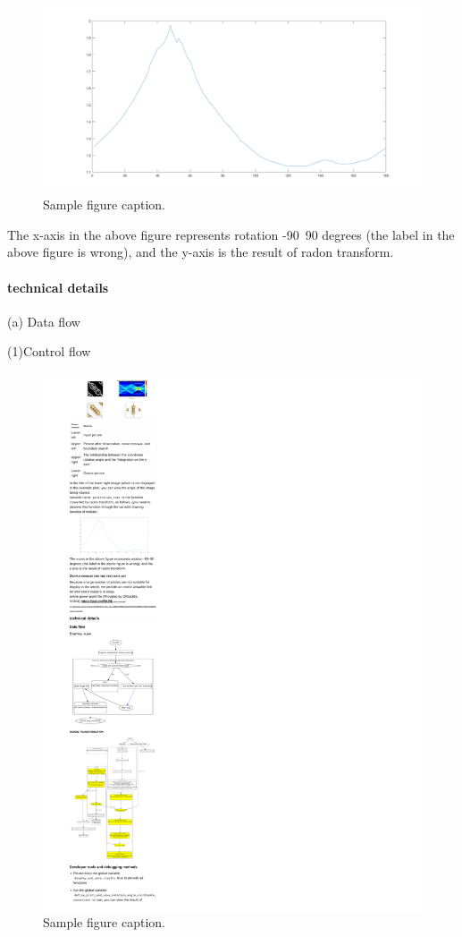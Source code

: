 \documentclass{article}
\begin{document}
\begin{figure}
	\centering
	\includegraphics[width=0.7\linewidth]{JFMMrt3.png}
	\caption{Sample figure caption.}
	\label{fig:JFMMrt3jpg}
\end{figure}

The x-axis in the above figure represents rotation -90~90 degrees (the label in the above figure is wrong), and the y-axis is the result of radon transform.

\paragraph{technical details}

(a) Data flow

(1)Control flow

\begin{figure}
	\centering
	\includegraphics[width=0.7\linewidth]{f0.pdf}
	\caption{Sample figure caption.}
	\label{fig:f0pdf}
\end{figure}
\end{document}
